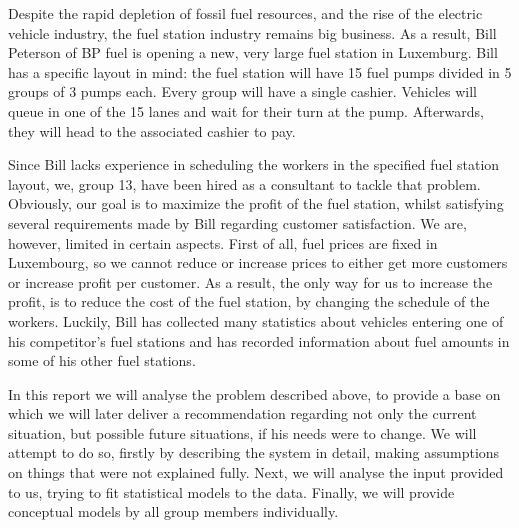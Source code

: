 Despite the rapid depletion of fossil fuel resources, and the rise of the electric vehicle industry, the fuel station industry remains big business.
As a result, Bill Peterson of BP fuel is opening a new, very large fuel station in Luxemburg.
Bill has a specific layout in mind: the fuel station will have 15 fuel pumps divided in 5 groups of 3 pumps each.
Every group will have a single cashier.
Vehicles will queue in one of the 15 lanes and wait for their turn at the pump.
Afterwards, they will head to the associated cashier to pay.

Since Bill lacks experience in scheduling the workers in the specified fuel station layout, we, group 13, have been hired as a consultant to tackle that problem.
Obviously, our goal is to maximize the profit of the fuel station, whilst satisfying several requirements made by Bill regarding customer satisfaction.
We are, however, limited in certain aspects.
First of all, fuel prices are fixed in Luxembourg, so we cannot reduce or increase prices to either get more customers or increase profit per customer.
As a result, the only way for us to increase the profit, is to reduce the cost of the fuel station, by changing the schedule of the workers.
Luckily, Bill has collected many statistics about vehicles entering one of his competitor's fuel stations and has recorded information about fuel amounts in some of his other fuel stations.

In this report we will analyse the problem described above, to provide a base on which we will later deliver a recommendation regarding not only the current situation, but possible future situations, if his needs were to change.
We will attempt to do so, firstly by describing the system in detail, making assumptions on things that were not explained fully.
Next, we will analyse the input provided to us, trying to fit statistical models to the data.
Finally, we will provide conceptual models by all group members individually.